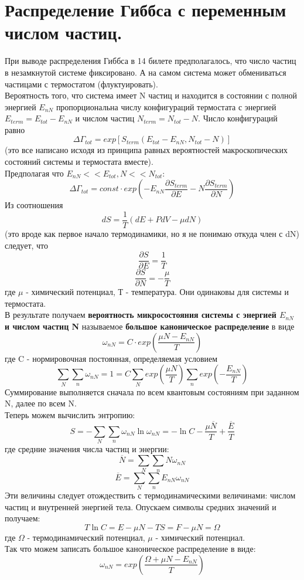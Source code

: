 \section{Распределение Гиббса с переменным числом частиц.}

При выводе распределения Гиббса в 14 билете предполагалось, что число частиц в незамкнутой системе фиксировано. А на самом система может обмениваться частицами с термостатом (флуктуировать).\\
Вероятность того, что система имеет N частиц и находится в состоянии с полной энергией $E_{nN}$ пропорциональна числу конфигураций термостата с энергией $E_{term}= E_{tot} -E_{nN}$ и числом частиц  $N_{term}= N_{tot} -N$. Число конфигураций равно
$$
\Delta \Gamma_{tot} = exp [S_{term}(E_{tot} - E_{nN}, N_{tot}-N)] 
$$
(это все написано исходя из принципа равных вероятностей макроскопических состояний системы и термостата вместе).\\
Предполагая что $E_{nN} << E_{tot}, N << N_{tot}$:
$$
\Delta \Gamma_{tot} = const \cdot exp(-E_{nN}\frac{\partial S_{term}}{\partial E}-N \frac{\partial S_{term}}{\partial N})
$$
Из соотношения 
$$
dS = \frac{1}{T}(dE + PdV - \mu dN)
$$
(это вроде как первое начало термодинамики, но я не понимаю откуда член с dN)
следует, что 
$$
\frac{\partial S}{\partial E} = \frac{1}{T}
$$
$$
\frac{\partial S}{\partial N} = -\frac{\mu}{T}
$$
где $\mu$ - химический потенциал, Т - температура. Они одинаковы для системы и термостата.\\
В результате получаем \textbf{вероятность микросостояния системы с энергией $E_{nN}$ и числом частиц N} называемое \textbf{большое каноническое распределение} в виде
$$
\omega_{nN} = C \cdot exp(\frac{\mu N - E_{nN}}{T})
$$
где C - нормировочная постоянная, определяемая условием 
$$
	\sum_{N}\sum_{n}\omega_{nN} = 1 = C \sum_{N}exp (\frac{\mu N}{T}) \sum_{n}exp(-\frac{E_{nN}}{T})
$$
Суммирование выполняется сначала по всем квантовым состояниям при заданном N, далее по всем N.\\
Теперь можем вычислить энтропию:
$$
S = - \sum_{N}\sum_{n}\omega_{nN}\ln\omega_{nN} = - \ln C - \frac{\mu \overline{N}}{T} + \frac{\overline{E}}{T}
$$
где средние значения числа частиц и энергии:
$$
\overline{N} = 	\sum_{N}\sum_{n}N \omega_{nN}
$$
$$
\overline{E} = \sum_{N}\sum_{n}E_{nN} \omega_{nN}
$$
Эти величины следует отождествить с термодинамическими величинами: числом частиц и внутренней энергией тела. Опускаем символы средних значений и получаем:
$$
T\ln C = E - \mu N - TS = F - \mu N = \Omega
$$
где $\Omega$ - термодинамический потенциал, $\mu$ - химический потенциал.\\
Так что можем записать большое каноническое распределение в виде:
$$
\omega_{nN} = exp (\frac{\Omega + \mu N - E_{nN}}{T})
$$





